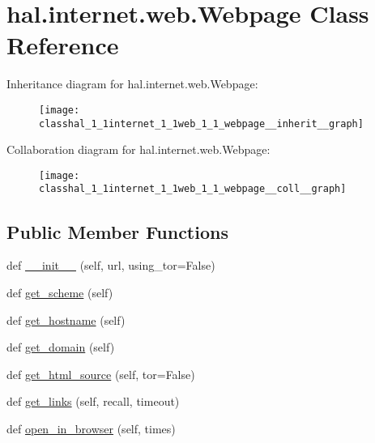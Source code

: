 \hypertarget{classhal_1_1internet_1_1web_1_1_webpage}{}\section{hal.\+internet.\+web.\+Webpage Class Reference}
\label{classhal_1_1internet_1_1web_1_1_webpage}


Inheritance diagram for hal.\+internet.\+web.\+Webpage\+:\nopagebreak
\begin{figure}[H]
\begin{center}
\leavevmode
\texttt{[image: classhal\_1\_1internet\_1\_1web\_1\_1\_webpage\_\_inherit\_\_graph]}
\end{center}
\end{figure}


Collaboration diagram for hal.\+internet.\+web.\+Webpage\+:\nopagebreak
\begin{figure}[H]
\begin{center}
\leavevmode
\texttt{[image: classhal\_1\_1internet\_1\_1web\_1\_1\_webpage\_\_coll\_\_graph]}
\end{center}
\end{figure}
\subsection*{Public Member Functions}
\begin{DoxyCompactItemize}
\item 
def \hyperlink{classhal_1_1internet_1_1web_1_1_webpage_abdd82419586ce1fab58d0d594a4780f8}{\+\_\+\+\_\+init\+\_\+\+\_\+} (self, url, using\+\_\+tor=False)
\item 
def \hyperlink{classhal_1_1internet_1_1web_1_1_webpage_a8a5f45d640b9a433fdd4ab4956141ed0}{get\+\_\+scheme} (self)
\item 
def \hyperlink{classhal_1_1internet_1_1web_1_1_webpage_ad3059e24c2ea962b13944209e086b1c8}{get\+\_\+hostname} (self)
\item 
def \hyperlink{classhal_1_1internet_1_1web_1_1_webpage_a1879c8695e4e1c7c0155d24100fbbbc0}{get\+\_\+domain} (self)
\item 
def \hyperlink{classhal_1_1internet_1_1web_1_1_webpage_ad813eba8e41c06f110311ada3ae86f2c}{get\+\_\+html\+\_\+source} (self, tor=False)
\item 
def \hyperlink{classhal_1_1internet_1_1web_1_1_webpage_a73b639e5eaa4506a653c9a4792f7dead}{get\+\_\+links} (self, recall, timeout)
\item 
def \hyperlink{classhal_1_1internet_1_1web_1_1_webpage_ae3904bbb1924178180ca32e922bbbeb5}{open\+\_\+in\+\_\+browser} (self, times)
\end{DoxyCompactItemize}
